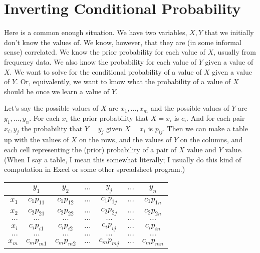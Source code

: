 
\def\mytitle{Probability and Expected Value}
\def\myauthor{Brian Weatherson}
\def\mydate{February 2, 2018}


\section{Inverting Conditional Probability}
\label{invertingconditionalprobability}

Here is a common enough situation. We have two variables, $X, Y$ that we initially don't know the values of. We know, however, that they are (in some informal sense) correlated. We know the prior probability for each value of $X$, usually from frequency data. We also know the probability for each value of $Y$ given a value of $X$. We want to solve for the conditional probability of a value of $X$ given a value of $Y$. Or, equivalently, we want to know what the probability of a value of $X$ should be once we learn a value of $Y$.

Let's say the possible values of $X$ are $x_1, \dots, x_m$ and the possible values of $Y$ are $y_1, \dots, y_n$. For each $x_i$ the prior probability that $X = x_i$ is $c_i$. And for each pair $x_i, y_j$ the probability that $Y = y_j$ given $X = x_i$ is $p_{ij}$. Then we can make a table up with the values of $X$ on the rows, and the values of $Y$ on the columns, and each cell representing the (prior) probability of a pair of $X$ value and $Y$ value. (When I say a table, I mean this somewhat literally; I usually do this kind of computation in Excel or some other spreadsheet program.)

\begin{table}[htbp]
\begin{minipage}{\linewidth}
\setlength{\tymax}{0.5\linewidth}
\centering
\small
\begin{tabulary}{\textwidth}{@{}rcccccc@{}} \toprule
  & $y_1$  & $y_2$  & $\dots$ & $y_j$  & $\dots$ & $y_n$  \\
\midrule

 $x_1$ & $c_1p_{11}$ & $c_1p_{12}$ & $\dots$ & $c_1p_{1j}$ & $\dots$ & $c_1p_{1n}$ \\
 $x_2$ & $c_2p_{21}$ & $c_2p_{22}$ & $\dots$ & $c_2p_{2j}$ & $\dots$ & $c_2p_{2n}$ \\
 $\dots$ & $\dots$ & $\dots$ & $\dots$ & $\dots$ & $\dots$ & $\dots$ \\
 $x_i$ & $c_ip_{i1}$ & $c_ip_{i2}$ & $\dots$ & $c_ip_{ij}$ & $\dots$ & $c_ip_{in}$ \\
 $\dots$ & $\dots$ & $\dots$ & $\dots$ & $\dots$ & $\dots$ & $\dots$ \\
 $x_m$ & $c_mp_{m1}$ & $c_mp_{m2}$ & $\dots$ & $c_mp_{mj}$ & $\dots$ & $c_mp_{mn}$ \\
\bottomrule

\end{tabulary}
\end{minipage}
\end{table}

